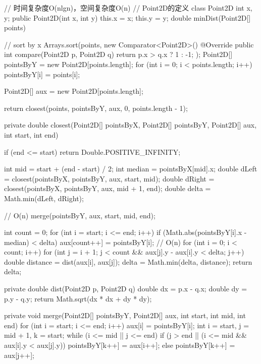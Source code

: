 \begin{Code}
// 时间复杂度O(nlgn)，空间复杂度O(n)
// Point2D的定义
class Point2D {
    int x, y;
    public Point2D(int x, int y) {
        this.x = x;
        this.y = y;
    }
}
double minDist(Point2D[] points) {
	// sort by x
    Arrays.sort(points, new Comparator<Point2D>() {
        @Override
        public int compare(Point2D p, Point2D q) {
            return p.x > q.x ? 1 : -1;
        }
    });
    Point2D[] pointsByY = new Point2D[points.length];
    for (int i = 0; i < points.length; i++) {
        pointsByY[i] = points[i];
    }
	
    Point2D[] aux = new Point2D[points.length];
	
    return closest(points, pointsByY, aux, 0, points.length - 1);
}

private double closest(Point2D[] pointsByX, Point2D[] pointsByY, Point2D[] aux, int start, int end) {
    if (end <= start) {
        return Double.POSITIVE_INFINITY;
    }
	
    int mid = start + (end - start) / 2;
    int median = pointsByX[mid].x;
    double dLeft = closest(pointsByX, pointsByY, aux, start, mid);
    double dRight = closest(pointsByX, pointsByY, aux, mid + 1, end);
    double delta = Math.min(dLeft, dRight);
	
    // O(n)
    merge(pointsByY, aux, start, mid, end);
	
    int count = 0;
    for (int i = start; i <= end; i++) {
        if (Math.abs(pointsByY[i].x - median) < delta) {
            aux[count++] = pointsByY[i];
        }
    }
    // O(n)
    for (int i = 0; i < count; i++) {
        for (int j = i + 1; j < count && aux[j].y - aux[i].y < delta; j++) {
            double distance = dist(aux[i], aux[j]);
            delta = Math.min(delta, distance);
        }
    }
    return delta;
}

private double dist(Point2D p, Point2D q) {
    double dx = p.x - q.x;
    double dy = p.y - q.y;
    return Math.sqrt(dx * dx + dy * dy);
}

private void merge(Point2D[] pointsByY, Point2D[] aux, int start, int mid, int end) {
    for (int i = start; i <= end; i++) {
	    aux[i] = pointsByY[i];
    }
    int i = start, j = mid + 1, k = start;
    while (i <= mid || j <= end) {
        if (j > end || (i <= mid && aux[i].y < aux[j].y)) {
            pointsByY[k++] = aux[i++];
        } else {
            pointsByY[k++] = aux[j++];
        }
    }
}
\end{Code}

